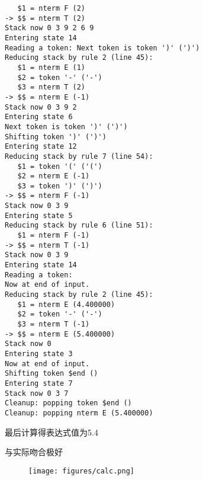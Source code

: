 \begin{verbatim}
   $1 = nterm F (2)
-> $$ = nterm T (2)
Stack now 0 3 9 2 6 9
Entering state 14
Reading a token: Next token is token ')' (')')
Reducing stack by rule 2 (line 45):
   $1 = nterm E (1)
   $2 = token '-' ('-')
   $3 = nterm T (2)
-> $$ = nterm E (-1)
Stack now 0 3 9 2
Entering state 6
Next token is token ')' (')')
Shifting token ')' (')')
Entering state 12
Reducing stack by rule 7 (line 54):
   $1 = token '(' ('(')
   $2 = nterm E (-1)
   $3 = token ')' (')')
-> $$ = nterm F (-1)
Stack now 0 3 9
Entering state 5
Reducing stack by rule 6 (line 51):
   $1 = nterm F (-1)
-> $$ = nterm T (-1)
Stack now 0 3 9
Entering state 14
Reading a token:
Now at end of input.
Reducing stack by rule 2 (line 45):
   $1 = nterm E (4.400000)
   $2 = token '-' ('-')
   $3 = nterm T (-1)
-> $$ = nterm E (5.400000)
Stack now 0
Entering state 3
Now at end of input.
Shifting token $end ()
Entering state 7
Stack now 0 3 7
Cleanup: popping token $end ()
Cleanup: popping nterm E (5.400000)
\end{verbatim}

最后计算得表达式值为5.4

与实际吻合极好

\begin{figure}[H]
  \centering
  \texttt{[image: figures/calc.png]}
\end{figure}